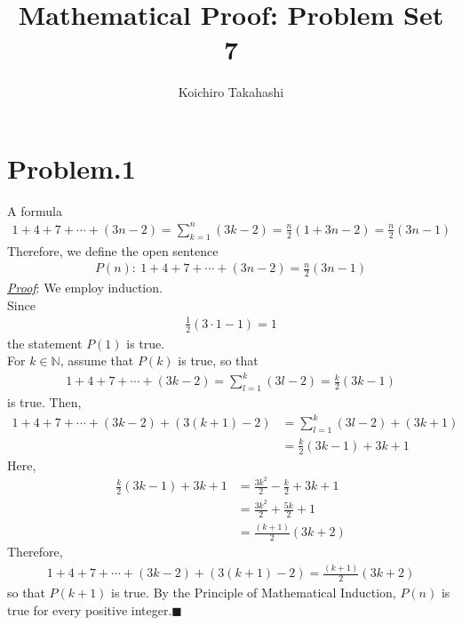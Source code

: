 \documentclass[12pt]{article}
\begin{document}
\title{Mathematical Proof: Problem Set 7}
\author{Koichiro Takahashi}
\maketitle 

\section*{Problem.1}
A formula
\begin{gather*}
1 + 4 + 7 + \cdots + (3n-2) = \sum_{k = 1}^{n} (3k - 2) = \frac{n}{2} (1 + 3n - 2) = \frac{n}{2} (3n - 1)
\end{gather*}
Therefore, we define the open sentence
\begin{gather*}
P(n):~ 1 + 4 + 7 + \cdots + (3n-2) = \frac{n}{2} (3n - 1)
\end{gather*}
\underline{\textit{Proof}}: We employ induction.\\[1em]
Since
\begin{gather*}
\frac{1}{2} (3\cdot 1 - 1) = 1
\end{gather*}
the statement $P(1)$ is true.\\
For $k \in \mathbb{N}$, assume that $P(k)$ is true, so that
\begin{gather*}
1 + 4 + 7 + \cdots + (3k-2) = \sum_{l = 1}^{k} (3l - 2) = \frac{k}{2} (3k - 1)
\end{gather*}
is true. Then,
\begin{align*}
1 + 4 + 7 + \cdots + (3k-2) + (3(k+1)-2) &= \sum_{l = 1}^{k} (3l - 2) + (3k+1)\\[1em]
&= \frac{k}{2} (3k - 1) + 3k + 1
\end{align*}
Here,
\begin{align*}
\frac{k}{2} (3k - 1) + 3k + 1
&= \frac{3 k^2}{2} - \frac{k}{2} + 3k + 1\\[1em]
&= \frac{3 k^2}{2} + \frac{5k}{2} + 1\\[1em]
&= \frac{(k+1)}{2} (3k+2)
\end{align*}
Therefore,
\begin{align*}
1 + 4 + 7 + \cdots + (3k-2) + (3(k+1)-2) = \frac{(k+1)}{2} (3k+2)
\end{align*}
so that $P(k+1)$ is true. By the Principle of Mathematical Induction, $P(n)$ is true for every positive integer.$\blacksquare$
\end{document}
